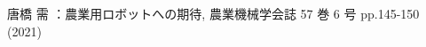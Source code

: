 \begin{center}
	\section*{}                      %
	\vspace*{-2zh}
\end{center}

\begin{thebibliography}{99}
	
	唐橋 需
	：農業用ロボットへの期待, 
	農業機械学会誌  57 巻 6 号 pp.145-150 (2021)
		
\end{thebibliography}
